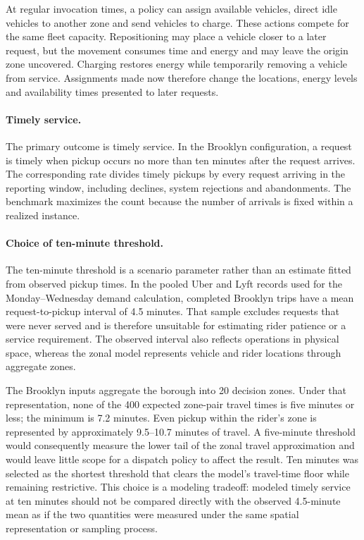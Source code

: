 At regular invocation times, a policy can assign available vehicles, direct idle vehicles to another
zone and send vehicles to charge. These actions compete for the same fleet capacity. Repositioning may
place a vehicle closer to a later request, but the movement consumes time and energy and may leave the
origin zone uncovered. Charging restores energy while temporarily removing a vehicle from service.
Assignments made now therefore change the locations, energy levels and availability times presented to
later requests.

\paragraph{Timely service.}
The primary outcome is timely service. In the Brooklyn configuration, a request is timely when pickup
occurs no more than ten minutes after the request arrives. The corresponding rate divides timely pickups
by every request arriving in the reporting window, including declines, system rejections and
abandonments. The benchmark maximizes the count because the number of arrivals is fixed within a
realized instance.

\paragraph{Choice of ten-minute threshold.}
The ten-minute threshold is a scenario parameter rather than an estimate fitted from observed pickup
times. In the pooled Uber and Lyft records used for the Monday--Wednesday demand calculation, completed
Brooklyn trips have a mean request-to-pickup interval of 4.5 minutes. That sample excludes requests that
were never served and is therefore unsuitable for estimating rider patience or a service requirement.
The observed interval also reflects operations in physical space, whereas the zonal model represents
vehicle and rider locations through aggregate zones.

The Brooklyn inputs aggregate the borough into 20 decision zones. Under that representation, none of the
400 expected zone-pair travel times is five minutes or less; the minimum is 7.2 minutes. Even pickup
within the rider's zone is represented by approximately 9.5--10.7 minutes of travel. A five-minute
threshold would consequently measure the lower tail of the zonal travel approximation and would leave
little scope for a dispatch policy to affect the result. Ten minutes was selected as the shortest
threshold that clears the model's travel-time floor while remaining restrictive. This choice is a
modeling tradeoff: modeled timely service at ten minutes should not be compared directly with the
observed 4.5-minute mean as if the two quantities were measured under the same spatial representation
or sampling process.

